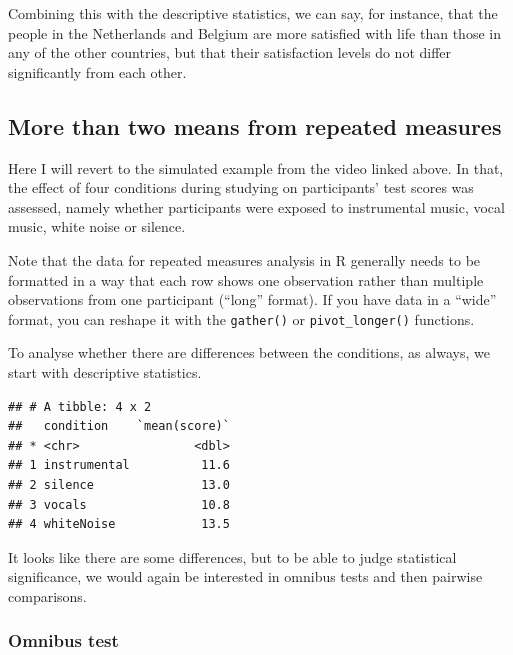 \documentclass[
]{book}
\newenvironment{Shaded}{\begin{snugshade}}{\end{snugshade}}
\newcommand{\KeywordTok}[1]{\textcolor[rgb]{0.13,0.29,0.53}{\textbf{#1}}}
\newcommand{\NormalTok}[1]{#1}
\newcommand{\OperatorTok}[1]{\textcolor[rgb]{0.81,0.36,0.00}{\textbf{#1}}}
\newcommand{\StringTok}[1]{\textcolor[rgb]{0.31,0.60,0.02}{#1}}
\begin{document}
Combining this with the descriptive statistics, we can say, for instance, that the people in the Netherlands and Belgium are more satisfied with life than those in any of the other countries, but that their satisfaction levels do not differ significantly from each other.

\hypertarget{more-than-two-means-from-repeated-measures}{%
\subsection{More than two means from repeated measures}\label{more-than-two-means-from-repeated-measures}}

Here I will revert to the simulated example from the video linked above. In that, the effect of four conditions during studying on participants' test scores was assessed, namely whether participants were exposed to instrumental music, vocal music, white noise or silence.

Note that the data for repeated measures analysis in R generally needs to be formatted in a way that each row shows one observation rather than multiple observations from one participant (``long'' format). If you have data in a ``wide'' format, you can reshape it with the \texttt{gather()} or \texttt{pivot\_longer()} functions.

To analyse whether there are differences between the conditions, as always, we start with descriptive statistics.

\begin{Shaded}
\end{Shaded}

\begin{verbatim}
## # A tibble: 4 x 2
##   condition    `mean(score)`
## * <chr>                <dbl>
## 1 instrumental          11.6
## 2 silence               13.0
## 3 vocals                10.8
## 4 whiteNoise            13.5
\end{verbatim}

It looks like there are some differences, but to be able to judge statistical significance, we would again be interested in omnibus tests and then pairwise comparisons.

\hypertarget{omnibus-test}{%
\subsubsection{Omnibus test}\label{omnibus-test}}
\end{document}
